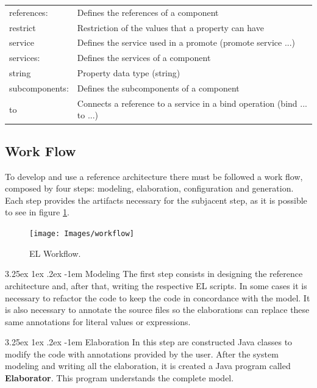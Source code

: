 \documentclass[11pt]{report}
\makeatletter
\renewcommand\paragraph{\@startsection{paragraph}{5}{\z@}%
	{3.25ex \@plus1ex \@minus.2ex}%
	{-1em}%
	{\normalfont\normalsize\bfseries}}
\makeatother
\begin{document}
\begin{table}[H]
\begin{tabular}{l|l}
				references: & Defines the references of a component \\
				
				restrict & Restriction of the values that a property can have \\
				
				service & Defines the service used in a promote (promote service ...)\\
				
				services: & Defines the services of a component \\
				
				string & Property data type (string) \\
				
				subcomponents: & Defines the subcomponents of a component \\
				
				to & Connects a reference to a service in a bind operation (bind ... to ...)\\
				\hline
			\end{tabular}
		\end{table}

		\subsection{Work Flow}
	
		\par To develop and use a reference architecture there must be followed a work flow, composed by four steps: modeling, elaboration, configuration and generation. Each step provides the artifacts necessary for the subjacent step, as it is possible to see in figure \ref{fig:workflow}.
		
		\begin{figure} [H]
			\centering
			\texttt{[image: Images/workflow]}
			\caption{EL Workflow.}
			\label{fig:workflow}
		\end{figure}
	
		\paragraph{Modeling} The first step consists in designing the reference architecture and, after that, writing the respective EL scripts. In some cases it is necessary to refactor the code to keep the code in concordance with the model. It is also necessary to annotate the source files so the elaborations can replace these same annotations for literal values or expressions.

		\paragraph{Elaboration} In this step are constructed Java classes to modify the code with annotations provided by the user. After the system modeling and writing all the elaboration, it is created a Java program called \textbf{Elaborator}. This program understands the complete model.
\end{document}
